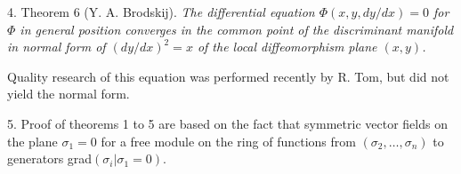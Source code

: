 \documentclass{article}
\begin{document}
4\degree.
Theorem 6 (Y. A. Brodskij).
\textit{The differential equation $\Phi(x,y,dy/dx)=0$ for $\Phi$ in general
position converges in the common point of the discriminant manifold in normal
form of $(dy/dx)^2=x$ of the local diffeomorphism plane $(x,y)$.}

Quality research of this equation was performed recently by R. Tom, but did not
yield the normal form.

5\degree.
Proof of theorems 1 to 5 are based on the fact that symmetric vector fields on
the plane $\sigma_1=0$ for a free module on the ring of functions from
$(\sigma_2,\dots,\sigma_n)$ to generators grad$(\sigma_i|\sigma_1=0)$.
\end{document}
